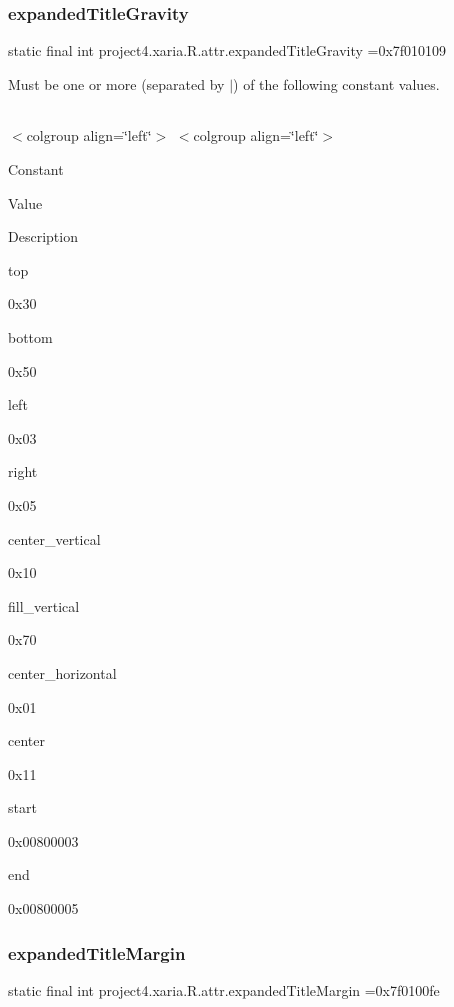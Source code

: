 \subsubsection{\texorpdfstring{expanded\+Title\+Gravity}{expandedTitleGravity}}
{\footnotesize\ttfamily static final int project4.\+xaria.\+R.\+attr.\+expanded\+Title\+Gravity =0x7f010109\hspace{0.3cm}{\ttfamily [static]}}

Must be one or more (separated by \textquotesingle{}$\vert$\textquotesingle{}) of the following constant values.

\tabulinesep=1mm
\begin{longtabu} spread 0pt [c]{*{0}{|X[-1]}|}
\hline
\end{longtabu}
$<$colgroup align=\char`\"{}left\char`\"{}$>$ $<$colgroup align=\char`\"{}left\char`\"{}$>$ 

Constant

Value

Description 

{\ttfamily top}

0x30

{\ttfamily bottom}

0x50

{\ttfamily left}

0x03

{\ttfamily right}

0x05

{\ttfamily center\+\_\+vertical}

0x10

{\ttfamily fill\+\_\+vertical}

0x70

{\ttfamily center\+\_\+horizontal}

0x01

{\ttfamily center}

0x11

{\ttfamily start}

0x00800003

{\ttfamily end}

0x00800005\mbox{\label{classproject4_1_1xaria_1_1R_1_1attr_a1d9d9ed4f17df16b8b4611683f70f25e}} 
\subsubsection{\texorpdfstring{expanded\+Title\+Margin}{expandedTitleMargin}}
{\footnotesize\ttfamily static final int project4.\+xaria.\+R.\+attr.\+expanded\+Title\+Margin =0x7f0100fe\hspace{0.3cm}{\ttfamily [static]}}

